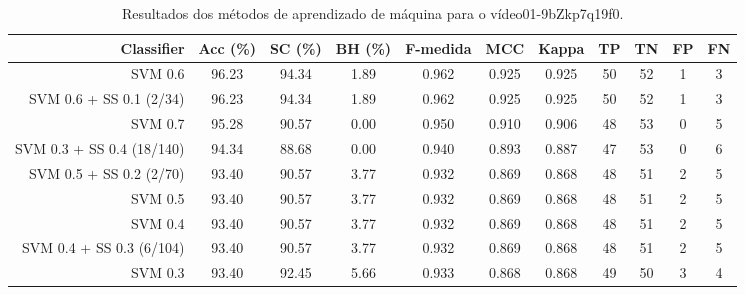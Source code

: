 \begin{table}[!htb]
\centering
\caption{Resultados dos métodos de aprendizado de máquina para o vídeo01-9bZkp7q19f0.}
\label{tab:01-9bZkp7q19f0}
\begin{tabular}{r|c|c|c|c|c|c|c|c|c|c}
\hline\hline
Classifier & Acc (\%) & SC (\%) & BH (\%) & F-medida & MCC & Kappa & TP & TN & FP & FN \\ \hline
SVM 0.6 & 96.23 & 94.34 & 1.89 & 0.962 & 0.925 & 0.925 & 50 & 52 & 1 & 3 \\ 
SVM 0.6 + SS 0.1 (2/34) & 96.23 & 94.34 & 1.89 & 0.962 & 0.925 & 0.925 & 50 & 52 & 1 & 3 \\ 
SVM 0.7 & 95.28 & 90.57 & 0.00 & 0.950 & 0.910 & 0.906 & 48 & 53 & 0 & 5 \\ 
SVM 0.3 + SS 0.4 (18/140) & 94.34 & 88.68 & 0.00 & 0.940 & 0.893 & 0.887 & 47 & 53 & 0 & 6 \\ 
SVM 0.5 + SS 0.2 (2/70) & 93.40 & 90.57 & 3.77 & 0.932 & 0.869 & 0.868 & 48 & 51 & 2 & 5 \\ 
SVM 0.5 & 93.40 & 90.57 & 3.77 & 0.932 & 0.869 & 0.868 & 48 & 51 & 2 & 5 \\ 
SVM 0.4 & 93.40 & 90.57 & 3.77 & 0.932 & 0.869 & 0.868 & 48 & 51 & 2 & 5 \\ 
SVM 0.4 + SS 0.3 (6/104) & 93.40 & 90.57 & 3.77 & 0.932 & 0.869 & 0.868 & 48 & 51 & 2 & 5 \\ 
SVM 0.3 & 93.40 & 92.45 & 5.66 & 0.933 & 0.868 & 0.868 & 49 & 50 & 3 & 4 \\ 
\hline\hline
\end{tabular}
\end{table}
